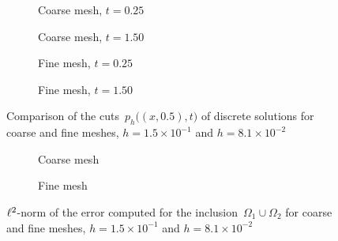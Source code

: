 \begin{figure}
 	\centering
 	\vskip 1cm
 	\begin{subfigure}{.45\linewidth}
 		\centering
 		\caption{Coarse mesh, $t = 0.25$}
 	\end{subfigure}%
 	\hfill
 	\begin{subfigure}{.45\linewidth}
 		\centering
 		\caption{Coarse mesh, $t = 1.50$}	
 	\end{subfigure}%
 	\par
 	\begin{subfigure}{.45\linewidth}
 		\centering
 		\caption{Fine mesh, $t = 0.25$}
 	\end{subfigure}%
 	\hfill
 	\begin{subfigure}{.45\linewidth}
 		\centering
		\caption{Fine mesh, $t = 1.50$}	
	\end{subfigure}%
	\caption{Comparison of the cuts~$p_h\big((x,0.5), t\big)$ of discrete solutions for coarse and fine meshes, $h = 1.5 \times 10^{-1}$ and $h = 8.1 \times 10^{-2}$ 		\label{fig:transient:cuts}}
\end{figure}
\clearpage

\begin{figure}[h]
	\centering
	\begin{subfigure}{.8\linewidth}
		\centering
		\caption{Coarse mesh}
	\end{subfigure}%
	\par
	\begin{subfigure}{.8\linewidth}
		\centering
		\caption{Fine mesh}	
	\end{subfigure}%
	\caption{${\ell^2}$-norm of the error computed for the inclusion~$\Omega_1 \cup \Omega_2$ for coarse and fine meshes, $h = 1.5 \times 10^{-1}$ and $h = 8.1 \times 10^{-2}$ \label{fig:transient:err}}
\end{figure}
